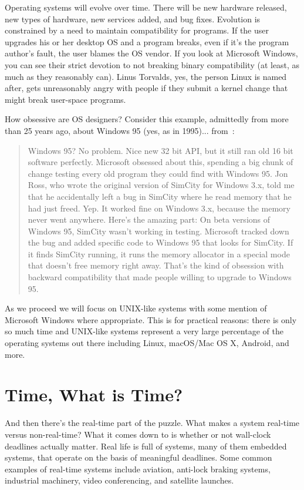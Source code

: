 Operating systems will evolve over time. There will be new hardware released, new types of hardware, new services added, and bug fixes. Evolution is constrained by a need to maintain compatibility for programs. If the user upgrades his or her desktop OS and a program breaks, even if it's the program author's fault, the user blames the OS vendor. If you look at Microsoft Windows, you can see their strict devotion to not breaking binary compatibility (at least, as much as they reasonably can). Linus Torvalds, yes, the person Linux is named after, gets unreasonably angry with people if they submit a kernel change that might break user-space programs. 

How obsessive are OS designers? Consider this example, admittedly from more than 25 years ago, about Windows 95 (yes, as in 1995)... from~\cite{joelce}:

\begin{quote}
Windows 95? No problem. Nice new 32 bit API, but it still ran old 16 bit software perfectly. Microsoft obsessed about this, spending a big chunk of change testing every old program they could find with Windows 95. Jon Ross, who wrote the original version of SimCity for Windows 3.x, told me that he accidentally left a bug in SimCity where he read memory that he had just freed. Yep. It worked fine on Windows 3.x, because the memory never went anywhere. Here's the amazing part: On beta versions of Windows 95, SimCity wasn't working in testing. Microsoft tracked down the bug and added specific code to Windows 95 that looks for SimCity. If it finds SimCity running, it runs the memory allocator in a special mode that doesn't free memory right away. That's the kind of obsession with backward compatibility that made people willing to upgrade to Windows 95.
\end{quote}

As we proceed we will focus on UNIX-like systems with some mention of Microsoft Windows where appropriate. This is for practical reasons: there is only so much time and UNIX-like systems represent a very large percentage of the operating systems out there including Linux, macOS/Mac OS X, Android, and more.

\section*{Time, What is Time?}
And then there's the real-time part of the puzzle. What makes a system real-time versus non-real-time? What it comes down to is whether or not wall-clock deadlines actually matter. Real life is full of systems, many of them embedded systems, that operate on the basis of meaningful deadlines. Some common examples of real-time systems include aviation, anti-lock braking systems, industrial machinery, video conferencing, and satellite launches.


